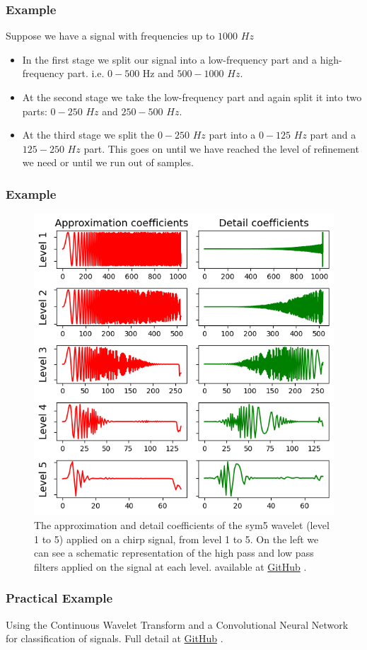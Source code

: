 \documentclass{beamer}
\newcommand{\github}{
\href{https://github.com/A-M-Kharazi/Machine-Learning-TMU}{GitHub}
}
\begin{document}
\begin{frame}
	\frametitle{Example}
	Suppose we have a signal with frequencies up to $1000$ $Hz$
	
	\begin{itemize}
		\item
		In the first stage we split our signal into a low-frequency part and a high-frequency part. i.e. $0-500$ Hz and $500-1000$ $Hz$.
		\item
		At the second stage we take the low-frequency part and again split it into two parts: $0-250$ $Hz$ and $250-500$ $Hz$.
		\item
		At the third stage we split the $0-250$ $Hz$ part into a $0-125$ $Hz$ part and a $125-250$ $Hz$ part.
		This goes on until we have reached the level of refinement we need or until we run out of samples.
	
	\end{itemize}
	
	
\end{frame}

\begin{frame}
	\frametitle{Example}
	\begin{center}
		\begin{figure}
			\includegraphics[scale=0.3]{multilevel_coefficients_schematic.png}
			\caption{The approximation and detail coefficients of the sym5 wavelet (level 1 to 5) applied on a chirp signal, from level 1 to 5. On the left we can see a schematic representation of the high pass and low pass filters applied on the signal at each level. available at \github.}
		\end{figure}
	\end{center}
\end{frame}


\begin{frame}
	\frametitle{Practical Example}
	
	Using the Continuous Wavelet Transform and a Convolutional Neural Network for classification of signals. Full detail at \github.
	
\end{frame}






	
	
\end{document}
